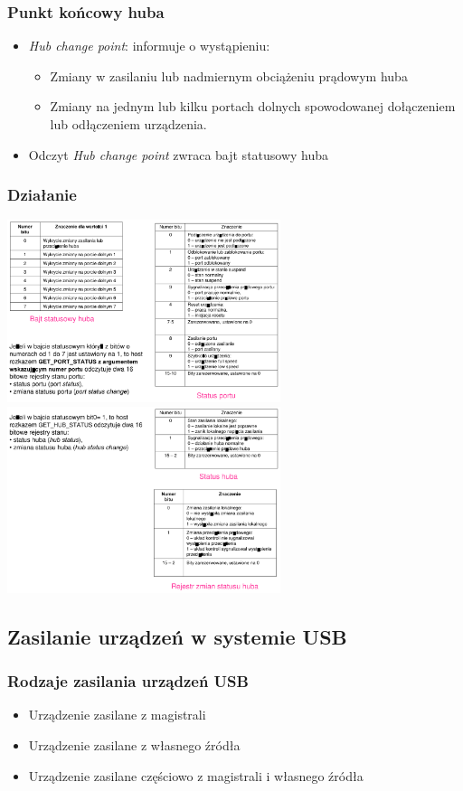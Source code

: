 	\subsubsection{Punkt końcowy huba}
	\begin{itemize}
		\item \emph{Hub change point}: informuje o wystąpieniu:
		\begin{itemize}
			\item Zmiany w zasilaniu lub nadmiernym obciążeniu prądowym huba
			\item Zmiany na jednym lub kilku portach dolnych spowodowanej dołączeniem lub odłączeniem urządzenia.
		\end{itemize}
		\item Odczyt \emph{Hub change point} zwraca bajt statusowy huba
	\end{itemize}
	\subsubsection{Działanie}
	\includegraphics[width=8cm]{./wyklady/USB_35_1.pdf}
	\includegraphics[width=8cm]{./wyklady/USB_36_1.pdf}
	
\subsection{Zasilanie urządzeń w systemie USB}
	\subsubsection{Rodzaje zasilania urządzeń USB}
	\begin{itemize}
		\item Urządzenie zasilane z magistrali
		\item Urządzenie zasilane z własnego źródła
		\item Urządzenie zasilane częściowo z magistrali i własnego źródła
	\end{itemize}
